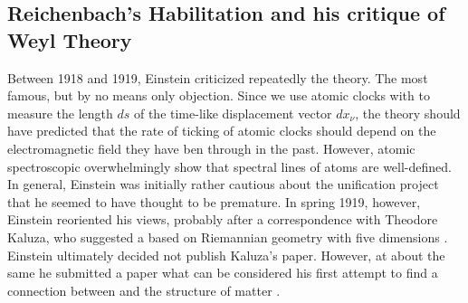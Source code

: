 \documentclass[draft]{article}
\begin{document}




\subsection{Reichenbach's Habilitation and his critique of Weyl Theory}

Between 1918 and 1919, Einstein criticized repeatedly the theory. The most famous, but by no means only objection. Since we use atomic clocks with to measure the length $ds$ of the time-like displacement vector $dx_\nu$, the theory should have predicted that the rate of ticking of atomic clocks should depend on the electromagnetic field they have ben through in the past. However, atomic spectroscopic overwhelmingly show that spectral lines of atoms are well-defined. In general, Einstein was initially rather cautious about the unification project that he seemed to have thought to be premature. In spring 1919, however, Einstein reoriented his views, probably after a correspondence with Theodore Kaluza, who suggested a \uft based on Riemannian geometry with five dimensions \citep{Wuensch2005}. Einstein ultimately decided not publish Kaluza's paper. However, at about the same he submitted a paper what can be considered his first attempt to find a connection between \gr and the structure of matter \citep{Einstein1919}.  
\end{document}

